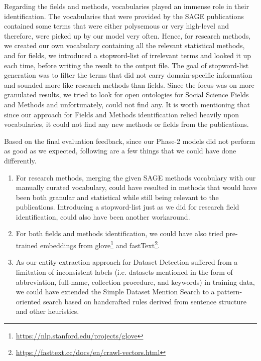 \documentclass[runningheads]{llncs}
\begin{document}
Regarding the fields and methods, vocabularies played an immense role in their identification. The vocabularies that were provided by the SAGE publications contained some terms that were either polysemous or very high-level and therefore, were picked up by our model very often. Hence, for research methods, we created our own vocabulary containing all the relevant statistical methods, and for fields, we introduced a stopword-list of irrelevant terms and looked it up each time, before writing the result to the output file. The goal of stopword-list generation was to filter the terms that did not carry domain-specific information and sounded more like research methods than fields. Since the focus was on more granulated results, we tried to look for open ontologies for Social Science Fields and Methods and unfortunately, could not find any. It is worth mentioning that since our approach for Fields and Methods identification relied heavily upon vocabularies, it could not find any new methods or fields from the publications. 

Based on the final evaluation feedback, since our Phase-2 models did not perform as good as we expected, following are a few things that we could have done differently.
\begin{enumerate}
    \item For research methods, merging the given SAGE methods vocabulary with our manually curated vocabulary, could have resulted in methods that would have been both granular and statistical while still being relevant to the publications. Introducing a stopword-list just as we did for research field identification, could also have been another workaround. 
    \item For both fields and methods identification, we could have also tried pre-trained embeddings from glove\footnote{\url{https://nlp.stanford.edu/projects/glove}} and fastText\footnote{\url{https://fasttext.cc/docs/en/crawl-vectors.html}}.
    \item As our entity-extraction approach for Dataset Detection suffered from a limitation of inconsistent labels (i.e. datasets mentioned in the form of abbreviation, full-name, collection procedure, and keywords) in training data, we could have extended the Simple Dataset Mention Search to a pattern-oriented search based on handcrafted rules derived from sentence structure and other heuristics. 
\end{enumerate}
\end{document}
